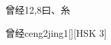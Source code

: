 \begin{entry}{曾经}{12,8}{⽈、⽷}
  \begin{phonetics}{曾经}{ceng2jing1}[][HSK 3]
  \end{phonetics}
\end{entry}
